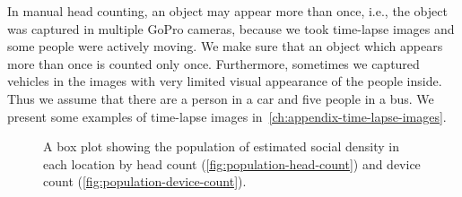 In manual head counting, an object may appear more than once, i.e., the object was captured in multiple GoPro cameras, because we took time-lapse images and some people were actively moving. We make sure that an object which appears more than once is counted only once. Furthermore, sometimes we captured vehicles in the images with very limited visual appearance of the people inside. Thus we assume that there are a person in a car and five people in a bus. We present some examples of time-lapse images in~\autoref{ch:appendix-time-lapse-images}.

\begin{figure}[h]
	\begin{adjustwidth}{-2cm}{}
	\centering
	\end{adjustwidth}
	\caption[A box plot of the population]{A box plot showing the population of estimated social density in each location by head count (\ref{fig:population-head-count}) and device count (\ref{fig:population-device-count}).}
	\label{fig:total-population}
\end{figure}

